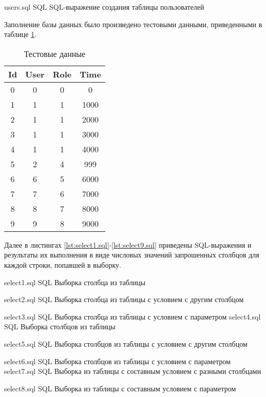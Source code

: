 {users.sql}
{SQL}
{SQL-выражение создания таблицы пользователей}

Заполнение базы данных было произведено тестовыми данными, приведенными в таблице \ref{tbl:data}.

\begin{table}[H]
	\caption{Тестовые данные}
	\label{tbl:data}
	\begin{tabular}{|c|c|c|c|}
		\hline
		Id & User & Role & Time \\ \hline
		0 & 0 & 0 & 0 \\ \hline
		1 & 1 & 1 & 1000 \\ \hline
		2 & 1 & 1 & 2000 \\ \hline
		3 & 1 & 1 & 3000 \\ \hline
		4 & 1 & 1 & 4000 \\ \hline
		5 & 2 & 4 & 999 \\ \hline
		6 & 6 & 5 & 6000 \\ \hline
		7 & 7 & 6 & 7000 \\ \hline
		8 & 8 & 7 & 8000 \\ \hline
		9 & 9 & 8 & 9000 \\ \hline
	\end{tabular}
\end{table}

Далее в листингах \ref{lst:select1.sql}-\ref{lst:select9.sql} приведены SQL-выражения и результаты их выполнения в виде числовых значений запрошенных столбцов для каждой строки, попавшей в выборку.
\pagebreak

{select1.sql}
{SQL}
{Выборка столбца из таблицы}

{select2.sql}
{SQL}
{Выборка столбца из таблицы с условием с другим столбцом}

{select3.sql}
{SQL}
{Выборка столбца из таблицы с условием с параметром}
\pagebreak
{}
{select4.sql}
{SQL}
{Выборка столбцов из таблицы}

{select5.sql}
{SQL}
{Выборка столбцов из таблицы с условием с другим столбцом}

{select6.sql}
{SQL}
{Выборка столбцов из таблицы с условием с параметром}
\pagebreak
{}
{select7.sql}
{SQL}
{Выборка из таблицы с составным условием с разными столбцами}

{select8.sql}
{SQL}
{Выборка из таблицы с составным условием с параметром}

